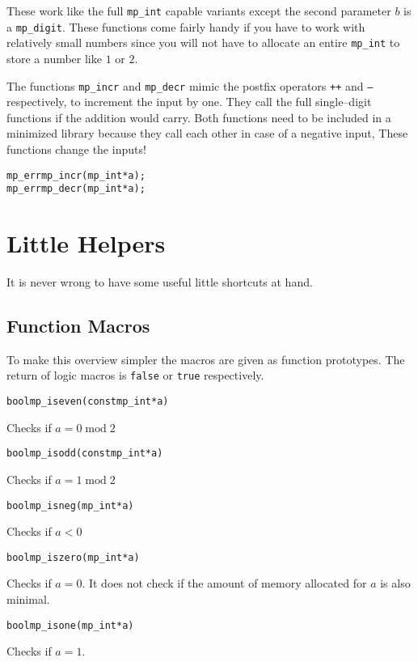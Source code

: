 \documentclass[synpaper]{book}
\begin{document}
These work like the full \texttt{mp\_int} capable variants except the second parameter $b$ is a
\texttt{mp\_digit}.  These functions come fairly handy if you have to work with relatively small numbers
since you will not have to allocate an entire \texttt{mp\_int} to store a number like $1$ or $2$.

The functions \texttt{mp\_incr} and \texttt{mp\_decr} mimic the postfix operators \texttt{++} and
\texttt{--} respectively, to increment the input by one. They call the full single--digit functions
if the addition would carry. Both functions need to be included in a minimized library because they
call each other in case of a negative input, These functions change the inputs!
 
\begin{alltt}
mp_err mp_incr(mp_int *a);
mp_err mp_decr(mp_int *a);
\end{alltt}

\chapter{Little Helpers}
It is never wrong to have some useful little shortcuts at hand.
\section{Function Macros}
To make this overview simpler the macros are given as function prototypes. The return of logic
macros is \texttt{false} or \texttt{true} respectively.

\begin{alltt}
bool mp_iseven(const mp_int *a)
\end{alltt}
Checks if $a = 0 \;\mathrm{mod}\; 2$

\begin{alltt}
bool mp_isodd(const mp_int *a)
\end{alltt}
Checks if $a = 1 \;\mathrm{mod}\; 2$

\begin{alltt}
bool mp_isneg(mp_int *a)
\end{alltt}
Checks if $a < 0$

\begin{alltt}
bool mp_iszero(mp_int *a)
\end{alltt}
Checks if $a = 0$. It does not check if the amount of memory allocated for $a$ is also minimal.

\begin{alltt}
bool mp_isone(mp_int *a)
\end{alltt}
Checks if $a = 1$.
\end{document}

